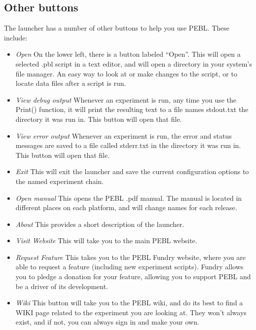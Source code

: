 \subsection{Other buttons}
The launcher has a number of other buttons to help you use PEBL.
These include:
\begin{itemize}

\item \emph{Open} On the lower left, there is a button labeled ``Open''.  This
  will open a selected .pbl script in a text editor, and will open a
  directory in your system's file manager.  An easy way to look at or
  make changes to the script, or to locate data files after a script is run. 

\item \emph{View debug output} Whenever an experiment is run, any time
  you use the Print() function, it will print the resulting text to a
  file names stdout.txt the directory it was run in.  This button will
  open that file.

\item \emph{View error output} Whenever an experiment is run, the
  error and status messages are saved to a file called stderr.txt in
  the directory it was run in.  This button will open that file.

\item \emph{Exit} This will exit the launcher and save the current
  configuration options to the named experiment chain.

\item \emph{Open manual} This opens the PEBL .pdf manual.  The manual
  is located in different places on each platform, and will change
  names for each release.

\item \emph{About} This provides a short description of the launcher.

\item \emph{Visit Website}  This will take you to the main PEBL website.

\item \emph{Request Feature}  This takes you to the PEBL Fundry
  website, where you are able to request a feature (including new
  experiment scripts).  Fundry allows you to pledge a donation for
  your feature, allowing you to support PEBL and be a driver
  of its development.

\item \emph{Wiki} This button will take you to the PEBL wiki, and do
  its best to find a WIKI page related to the experiment you are
  looking at. They won't always exist, and if not, you can always sign
  in and make your own.

\end{itemize}

